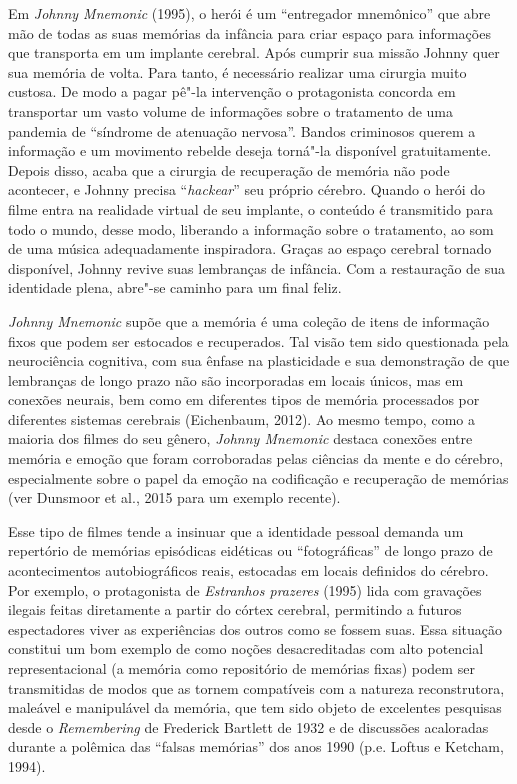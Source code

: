 Em \emph{Johnny Mnemonic} (1995), o herói é um ``entregador mnemônico''
que abre mão de todas as suas memórias da infância para criar espaço
para informações que transporta em um implante cerebral. Após cumprir
sua missão Johnny quer sua memória de volta. Para tanto, é necessário
realizar uma cirurgia muito custosa. De modo a pagar pê"-la intervenção o
protagonista concorda em transportar um vasto volume de informações
sobre o tratamento de uma pandemia de ``síndrome de atenuação nervosa''.
Bandos criminosos querem a informação e um movimento rebelde deseja
torná"-la disponível gratuitamente. Depois disso, acaba que a cirurgia de
recuperação de memória não pode acontecer, e Johnny precisa
``\emph{hackear}'' seu próprio cérebro. Quando o herói do filme entra na
realidade virtual de seu implante, o conteúdo é transmitido para todo o
mundo, desse modo, liberando a informação sobre o tratamento, ao som de
uma música adequadamente inspiradora. Graças ao espaço cerebral tornado
disponível, Johnny revive suas lembranças de infância. Com a restauração
de sua identidade plena, abre"-se caminho para um final feliz.

\emph{Johnny Mnemonic} supõe que a memória é uma coleção de itens de
informação fixos que podem ser estocados e recuperados. Tal visão tem
sido questionada pela neurociência cognitiva, com sua ênfase na
plasticidade e sua demonstração de que lembranças de longo prazo não são
incorporadas em locais únicos, mas em conexões neurais, bem como em
diferentes tipos de memória processados por diferentes sistemas
cerebrais (Eichenbaum, 2012). Ao mesmo tempo, como a maioria dos filmes
do seu gênero, \emph{Johnny Mnemonic} destaca conexões entre memória e
emoção que foram corroboradas pelas ciências da mente e do cérebro,
especialmente sobre o papel da emoção na codificação e recuperação de
memórias (ver Dunsmoor et al., 2015 para um exemplo recente).

Esse tipo de filmes tende a insinuar que a identidade pessoal demanda um
repertório de memórias episódicas eidéticas ou ``fotográficas'' de longo
prazo de acontecimentos autobiográficos reais, estocadas em locais
definidos do cérebro. Por exemplo, o protagonista de \emph{Estranhos
prazeres} (1995) lida com gravações ilegais feitas diretamente a partir
do córtex cerebral, permitindo a futuros espectadores viver as
experiências dos outros como se fossem suas. Essa situação constitui um
bom exemplo de como noções desacreditadas com alto potencial
representacional (a memória como repositório de memórias fixas) podem
ser transmitidas de modos que as tornem compatíveis com a natureza
reconstrutora, maleável e manipulável da memória, que tem sido objeto de
excelentes pesquisas desde o \emph{Remembering} de Frederick Bartlett de
1932 e de discussões acaloradas durante a polêmica das ``falsas
memórias'' dos anos 1990 (p.e. Loftus e Ketcham, 1994).

